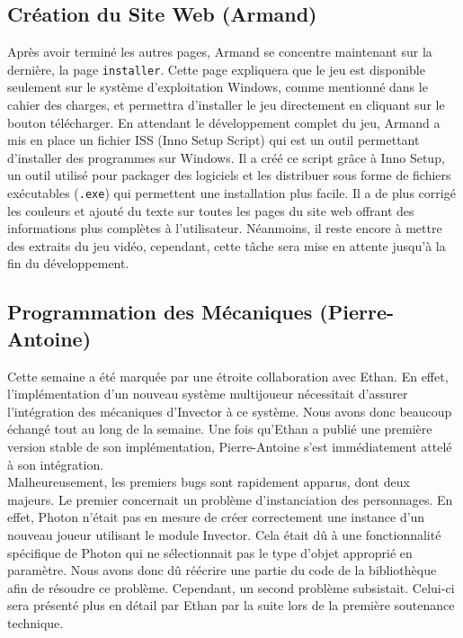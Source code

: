 \documentclass{report}
\begin{document}
\subsection*{Création du Site Web (Armand)}
Après avoir terminé les autres pages, Armand se concentre maintenant sur la dernière, la page \texttt{installer}. Cette page expliquera que le jeu est disponible seulement sur le système d'exploitation Windows, comme mentionné dans le cahier des charges, et permettra d’installer le jeu directement en cliquant sur le bouton télécharger. En attendant le développement complet du jeu, Armand a mis en place un fichier ISS (Inno Setup Script) qui est un outil permettant d’installer des programmes sur Windows. Il a créé ce script grâce à Inno Setup, un outil utilisé pour packager des logiciels et les distribuer sous forme de fichiers exécutables (\texttt{.exe}) qui permettent une installation plus facile. Il a de plus corrigé les couleurs et ajouté du texte sur toutes les pages du site web offrant des informations plus complètes à l’utilisateur. Néanmoins, il reste encore à mettre des extraits du jeu vidéo, cependant, cette tâche sera mise en attente jusqu’à la fin du développement. 

\subsection*{Programmation des Mécaniques (Pierre-Antoine)}

Cette semaine a été marquée par une étroite collaboration avec Ethan. En effet, l'implémentation d'un nouveau système multijoueur nécessitait d'assurer l'intégration des mécaniques d'Invector à ce système. Nous avons donc beaucoup échangé tout au long de la semaine. Une fois qu'Ethan a publié une première version stable de son implémentation, Pierre-Antoine s'est immédiatement attelé à son intégration.
\\[0.4cm]
Malheureusement, les premiers bugs sont rapidement apparus, dont deux majeurs. Le premier concernait un problème d'instanciation des personnages. En effet, Photon n'était pas en mesure de créer correctement une instance d'un nouveau joueur utilisant le module Invector. Cela était dû à une fonctionnalité spécifique de Photon qui ne sélectionnait pas le type d'objet approprié en paramètre. Nous avons donc dû réécrire une partie du code de la bibliothèque afin de résoudre ce problème. Cependant, un second problème subsistait. Celui-ci sera présenté plus en détail par Ethan par la suite lors de la première soutenance technique.
\end{document}
